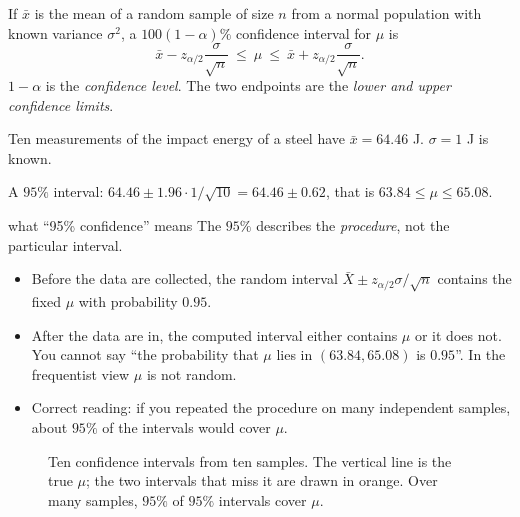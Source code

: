 \begin{definition}
If $\bar{x}$ is the mean of a random sample of size $n$ from a normal population with known variance $\sigma^2$, a $100(1-\alpha)\%$ confidence interval for $\mu$ is
\[ \bar{x}-z_{\alpha/2}\frac\sigma{\sqrt n}\ \le\ \mu\ \le\ \bar{x}+z_{\alpha/2}\frac\sigma{\sqrt n}. \]
$1-\alpha$ is the \emph{confidence level}. The two endpoints are the \emph{lower and upper confidence limits}.
\end{definition}

\begin{example}\label{ex:ci-known}
Ten measurements of the impact energy of a steel have $\bar{x}=64.46$ J. $\sigma=1$ J is known.

A $95\%$ interval: $64.46\pm1.96\cdot1/\sqrt{10}=64.46\pm0.62$, that is $63.84\le\mu\le65.08$.
\end{example}

\begin{pitfall}{what ``95\% confidence'' means}
The $95\%$ describes the \emph{procedure}, not the particular interval.
\begin{itemize}
  \item Before the data are collected, the random interval $\bar{X}\pm z_{\alpha/2}\sigma/\sqrt n$ contains the fixed $\mu$ with probability $0.95$.
  \item After the data are in, the computed interval either contains $\mu$ or it does not. You cannot say ``the probability that $\mu$ lies in $(63.84,65.08)$ is $0.95$''. In the frequentist view $\mu$ is not random.
  \item Correct reading: if you repeated the procedure on many independent samples, about $95\%$ of the intervals would cover $\mu$.
\end{itemize}
\end{pitfall}

\begin{figure}[h]
\centering
{}
\caption{Ten confidence intervals from ten samples. The vertical line is the true $\mu$; the two intervals that miss it are drawn in orange. Over many samples, $95\%$ of $95\%$ intervals cover $\mu$.}
\end{figure}

